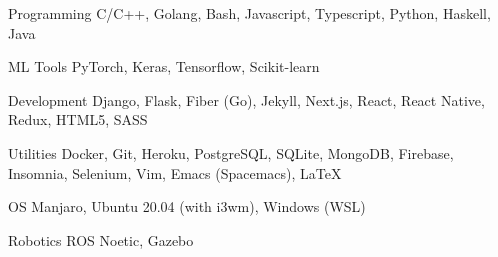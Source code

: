 

\begin{cvskills}

  \cvskill
    {Programming} %
    {C/C++, Golang, Bash, Javascript, Typescript, Python, Haskell, Java} %
    
  \cvskill
  {ML Tools} %
  {PyTorch, Keras, Tensorflow, Scikit-learn} %

  \cvskill
    {Development} %
    {Django, Flask, Fiber (Go), Jekyll, Next.js, React, React Native, Redux, HTML5, SASS} %

  \cvskill
  {Utilities} %
  {Docker, Git, Heroku, PostgreSQL, SQLite, MongoDB, Firebase, Insomnia, Selenium, Vim, Emacs (Spacemacs), \LaTeX} %

  \cvskill
  {OS} %
  {Manjaro, Ubuntu 20.04 (with i3wm), Windows (WSL)} %

  \cvskill
  {Robotics} %
  {ROS Noetic, Gazebo} %
\end{cvskills}
